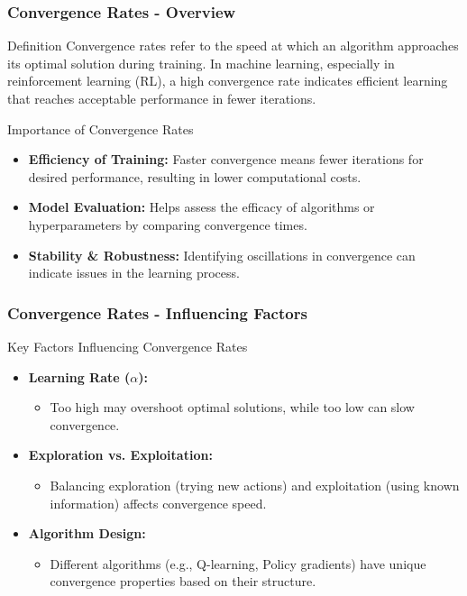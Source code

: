 \documentclass{beamer}
\begin{document}
\begin{frame}[fragile]
    \frametitle{Convergence Rates - Overview}
    \begin{block}{Definition}
        Convergence rates refer to the speed at which an algorithm approaches its optimal solution during training. In machine learning, especially in reinforcement learning (RL), a high convergence rate indicates efficient learning that reaches acceptable performance in fewer iterations.
    \end{block}
    
    \begin{block}{Importance of Convergence Rates}
        \begin{itemize}
            \item \textbf{Efficiency of Training:} Faster convergence means fewer iterations for desired performance, resulting in lower computational costs.
            \item \textbf{Model Evaluation:} Helps assess the efficacy of algorithms or hyperparameters by comparing convergence times.
            \item \textbf{Stability \& Robustness:} Identifying oscillations in convergence can indicate issues in the learning process.
        \end{itemize}
    \end{block}
\end{frame}

\begin{frame}[fragile]
    \frametitle{Convergence Rates - Influencing Factors}
    \begin{block}{Key Factors Influencing Convergence Rates}
        \begin{itemize}
            \item \textbf{Learning Rate ($\alpha$):} 
                \begin{itemize}
                    \item Too high may overshoot optimal solutions, while too low can slow convergence.
                \end{itemize}
            \item \textbf{Exploration vs. Exploitation:}
                \begin{itemize}
                    \item Balancing exploration (trying new actions) and exploitation (using known information) affects convergence speed.
                \end{itemize}
            \item \textbf{Algorithm Design:}
                \begin{itemize}
                    \item Different algorithms (e.g., Q-learning, Policy gradients) have unique convergence properties based on their structure.
                \end{itemize}
        \end{itemize}
    \end{block}
\end{frame}
\end{document}
